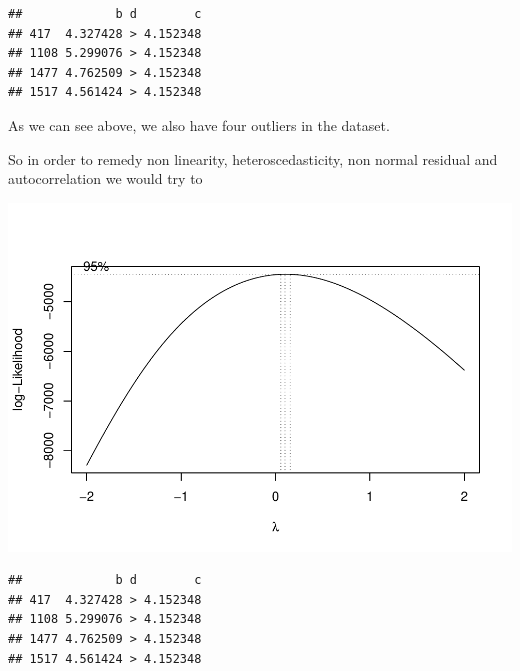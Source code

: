 \documentclass[
]{article}
\begin{document}
\begin{verbatim}
##             b d        c
## 417  4.327428 > 4.152348
## 1108 5.299076 > 4.152348
## 1477 4.762509 > 4.152348
## 1517 4.561424 > 4.152348
\end{verbatim}

As we can see above, we also have four outliers in the dataset.

So in order to remedy non linearity, heteroscedasticity, non normal
residual and autocorrelation we would try to

\includegraphics{Final_Project_2_files/figure-latex/unnamed-chunk-15-1.pdf}

\begin{verbatim}
##             b d        c
## 417  4.327428 > 4.152348
## 1108 5.299076 > 4.152348
## 1477 4.762509 > 4.152348
## 1517 4.561424 > 4.152348
\end{verbatim}
\end{document}
